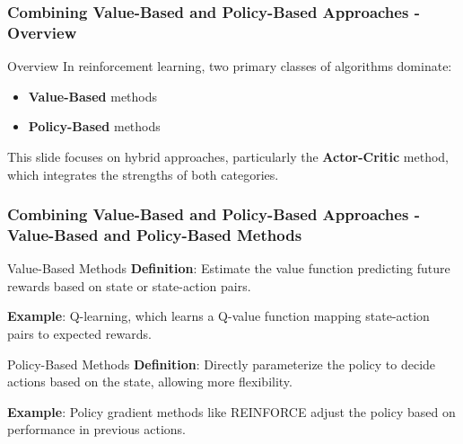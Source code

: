 \documentclass[aspectratio=169]{beamer}
\begin{document}
\begin{frame}[fragile]
    \frametitle{Combining Value-Based and Policy-Based Approaches - Overview}
    \begin{block}{Overview}
        In reinforcement learning, two primary classes of algorithms dominate:
        \begin{itemize}
            \item \textbf{Value-Based} methods
            \item \textbf{Policy-Based} methods
        \end{itemize}
        This slide focuses on hybrid approaches, particularly the \textbf{Actor-Critic} method, which integrates the strengths of both categories.
    \end{block}
\end{frame}

\begin{frame}[fragile]
    \frametitle{Combining Value-Based and Policy-Based Approaches - Value-Based and Policy-Based Methods}
    \begin{block}{Value-Based Methods}
        \textbf{Definition}: Estimate the value function predicting future rewards based on state or state-action pairs.
        
        \textbf{Example}: Q-learning, which learns a Q-value function mapping state-action pairs to expected rewards.
    \end{block}
    
    \begin{block}{Policy-Based Methods}
        \textbf{Definition}: Directly parameterize the policy to decide actions based on the state, allowing more flexibility.
        
        \textbf{Example}: Policy gradient methods like REINFORCE adjust the policy based on performance in previous actions.
    \end{block}
\end{frame}
\end{document}
